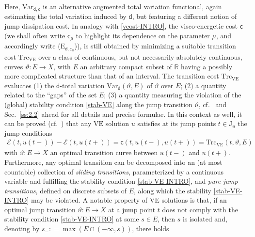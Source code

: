 \documentclass[a4paper,10pt,reqno]{amsart} %
\newcommand{\R}{\mathbb{R}}
\numberwithin{equation}{section}
\newcommand{\teta}{\vartheta}
\newcommand{\Xs}{X}
\newcommand{\AC}{\mathrm{AC}}
\newcommand{\mdn}{\mathsf{d}}
\newcommand{\ene}[2]{\mathcal{E}(#1,#2)}
\newcommand{\Vars}[3]{\mathrm{Var}_{#1}(#2,#3)}
\newcommand{\Varname}[1]{\mathrm{Var}_{#1}}
\newcommand{\lli}[2]{{#1}({#2}{-})}
\newcommand{\rli}[2]{{#1}({#2}{+})}
\newcommand{\jump}[1]{\mathrm{J}_{#1}}
\newcommand{\vecostname}{\mathsf{c}}
\newcommand{\vecost}[3]{\mathsf{c}(#1,#2,#3)}
\newcommand{\vecostnamep}[1]{\mathsf{c}_{#1}}
\newcommand{\VE}{\mathrm{VE}}
\newcommand{\tcost}[4]{\mathrm{Trc}_{#1}(#2,#3,#4)}
\newcommand{\tcostname}[1]{\mathrm{Trc}_{#1}}
\newcommand{\RRR}{\color{red}}
\begin{document}
Here, $\Varname {\mdn,\vecostname}$ is an alternative augmented total variation functional,
 again estimating the total variation induced by $\mdn$, but featuring  a different notion of jump dissipation cost. In analogy with \eqref{vcost-INTRO}, the visco-energetic cost  $\vecostname$  (we shall often write $\vecostnamep{\mu}$ to highlight its dependence on the parameter $\mu$, and accordingly write ($\mathrm{E}_{\mdn,\vecostnamep{\mu}}$)),  is still  obtained by minimizing a suitable transition cost 
$\tcostname{\VE}$ 
 over a class of continuous, but not necessarily absolutely continuous, curves $\teta: E \to \Xs$, with $E$ an arbitrary  compact subset of $\R$ having a possibly more complicated structure than that of an interval. 
The transition cost  $\tcostname{\VE}$  evaluates (1) the $\mdn$-total variation $\Vars{\mdn} \teta E $ of $\teta$ over $E$; (2) a quantity related to the ``gaps'' of the set $E$; (3) a quantity measuring the violation of the (global) stability condition \eqref{stab-VE} along the jump transition $\teta$, cf.\ 
 \cite{SavMin16}  and 
Sec.\ \ref{ss:2.2} ahead  for all details and precise formulae. In this context as well, it can be proved (cf.\ \cite[Prop.\ 3.8]{SavMin16}) that any $\VE$ solution $u$  satisfies at  its jump points $t\in \jump u $ the jump conditions
\begin{equation}
\begin{aligned}
\label{ve-jump-cond-INTR0}
\ene t{\lli u t } - \ene t{\rli ut}  = \vecost t{\lli ut}{\rli u t} =    \tcost{\VE} {t}{\teta}E
\end{aligned}
 \end{equation}
 with $\teta: E \to \Xs$ an optimal transition curve between $\lli u t$ and $\rli u t$. Furthermore, 
 any optimal transition can be decomposed into an (at most countable) collection of \emph{sliding transitions}, parameterized by a continuous variable and fulfilling the stability condition \eqref{stab-VE-INTRO}, and \emph{pure jump transitions}, defined on discrete subsets of $E$, along which the stability  \eqref{stab-VE-INTRO} may be violated.
  A notable property %
 of  $\VE$ solutions is that, if an optimal jump transition $\teta:E \to \Xs$ at a jump point $t$ does not comply with the stability condition 
\eqref{stab-VE-INTRO} at some $s\in E$, then $s$ is isolated and, denoting by $s_-: = \max (E \cap ({-}\infty,s))$, there holds
\end{document}
